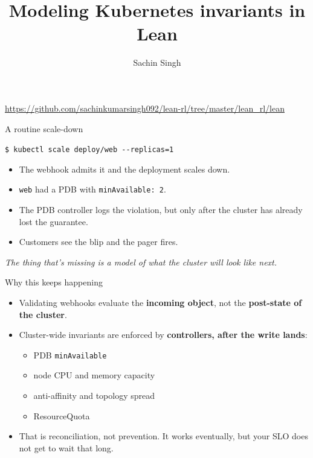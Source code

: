 \documentclass[10pt,aspectratio=169]{beamer}
\title{\bfseries Modeling Kubernetes invariants in Lean}
\author{Sachin Singh}
\date{}
\begin{document}
\begin{frame}
  \titlepage
  \vspace{-0.6em}
  \centerline{\small\url{https://github.com/sachinkumarsingh092/lean-rl/tree/master/lean_rl/lean}}
\end{frame}

\begin{frame}{A routine scale-down}
\large
\begin{center}
\texttt{\$ kubectl scale deploy/web {-}{-}replicas=1}
\end{center}
\vspace{0.6em}
\small
\begin{itemize}\itemsep0.35em
  \item The webhook admits it and the deployment scales down.
  \item \texttt{web} had a PDB with \texttt{minAvailable: 2}.
  \item The PDB controller logs the violation, but only after the cluster has already lost the guarantee.
  \item Customers see the blip and the pager fires.
\end{itemize}
\vspace{0.6em}
\centerline{\itshape The thing that's missing is a model of what the cluster will look like next.}
\end{frame}



\begin{frame}{Why this keeps happening}
\begin{itemize}\itemsep0.5em
  \item Validating webhooks evaluate the \textbf{incoming object}, not the \textbf{post-state of the cluster}.
  \item Cluster-wide invariants are enforced by \textbf{controllers, after the write lands}:
  \begin{itemize}\itemsep0.15em
    \item PDB \texttt{minAvailable}
    \item node CPU and memory capacity
    \item anti-affinity and topology spread
    \item ResourceQuota
  \end{itemize}
  \item That is reconciliation, not prevention. It works eventually, but your SLO does not get to wait that long.
\end{itemize}
\end{frame}
\end{document}
